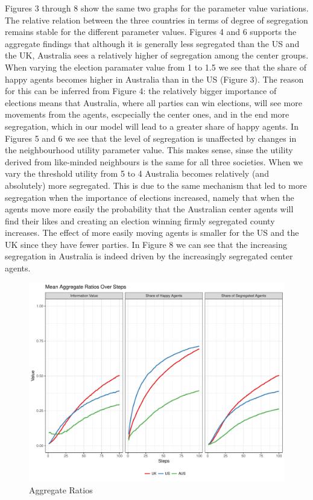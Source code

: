 \documentclass[12pt, a4paper]{article}
\begin{document}
Figures 3 through 8 show the same two graphs for the parameter value variations. The relative relation between the three countries in terms of degree of segregation remains stable for the different parameter values. Figures 4 and 6 supports the aggregate findings that although it is generally less segregated than the US and the UK, Australia sees a relatively higher of segregation among the center groups. When varying the election paramater value from 1 to 1.5 we see that the share of happy agents becomes higher in Australia than in the US (Figure 3). The reason for this can be inferred from Figure 4: the relatively bigger importance of elections means that Australia, where all parties can win elections, will see more movements from the agents, escpecially the center ones, and in the end more segregation, which in our model will lead to a greater share of happy agents. In Figures 5 and 6 we see that the level of segregation is unaffected by changes in the neighbourhood utility parameter value. This makes sense, sinse the utility derived from like-minded neighbours is the same for all three societies. When we vary the threshold utility from 5 to 4 Australia becomes relatively (and absolutely) more segregated. This is due to the same mechanism that led to more segregation when the importance of elections increased, namely that when the agents move more easily the probability that the Australian center agents will find their likes and creating an election winning firmly segregated county increases. The effect of more easily moving agents is smaller for the US and the UK since they have fewer parties. In Figure 8 we can see that the increasing segregation in Australia is indeed driven by the increasingly segregated center agents.        

\begin{figure}[bp!]
	\centering
	\caption{Aggregate Ratios}
	\includegraphics[scale=0.6]{./Plots/agg_ratios.pdf}
\end{figure}
\end{document}
